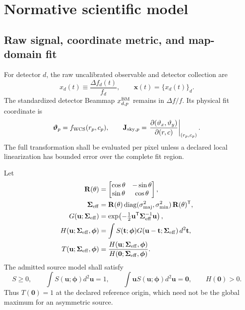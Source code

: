 \section{Normative scientific model}
\label{sec:equations}

\subsection{Raw signal, coordinate metric, and map-domain fit}

For detector $d$, the raw uncalibrated observable and detector collection are
\begin{equation}
x_d(t)\equiv\frac{\Delta f_d(t)}{f_d},
\qquad \mathbf x(t)=\{x_d(t)\}_d .
\label{eq:raw-signal}
\end{equation}
The standardized detector Beammap $x^{\rm BM}_{d,p}$ remains in $\Delta f/f$.
Its physical fit coordinate is
\begin{equation}
\boldsymbol\vartheta_p=f_{\rm WCS}(r_p,c_p),
\qquad
\mathbf J_{{\rm sky},p}=
\left.\frac{\partial(\vartheta_x,\vartheta_y)}{\partial(r,c)}\right|_{(r_p,c_p)} .
\label{eq:wcs}
\end{equation}
The full transformation shall be evaluated per pixel unless a declared local
linearization has bounded error over the complete fit region.

Let
\begin{align}
\mathbf R(\theta)&=
\begin{bmatrix}\cos\theta&-\sin\theta\\ \sin\theta&\cos\theta\end{bmatrix},\\
\boldsymbol\Sigma_{\rm eff}&=
\mathbf R(\theta)\,
\mathrm{diag}(\sigma_{\rm maj}^2,\sigma_{\rm min}^2)\,
\mathbf R(\theta)^\mathsf T,\\
G(\mathbf u;\boldsymbol\Sigma_{\rm eff})&=
\exp\!\left(-\tfrac12\mathbf u^\mathsf T
\boldsymbol\Sigma_{\rm eff}^{-1}\mathbf u\right),\\
H(\mathbf u;\boldsymbol\Sigma_{\rm eff},\boldsymbol\phi)&=
\int S(\mathbf t;\boldsymbol\phi)
G(\mathbf u-\mathbf t;\boldsymbol\Sigma_{\rm eff})\,d^2\mathbf t,\\
T(\mathbf u;\boldsymbol\Sigma_{\rm eff},\boldsymbol\phi)&=
\frac{H(\mathbf u;\boldsymbol\Sigma_{\rm eff},\boldsymbol\phi)}
{H(\mathbf0;\boldsymbol\Sigma_{\rm eff},\boldsymbol\phi)} .
\label{eq:template}
\end{align}
The admitted source model shall satisfy
\begin{equation}
S\ge0,\qquad
\int S(\mathbf u;\boldsymbol\phi)d^2\mathbf u=1,\qquad
\int\mathbf uS(\mathbf u;\boldsymbol\phi)d^2\mathbf u=\mathbf0,
\qquad H(\mathbf0)>0.
\label{eq:source}
\end{equation}
Thus $T(\mathbf0)=1$ at the declared reference origin, which need not be the
global maximum for an asymmetric source.

